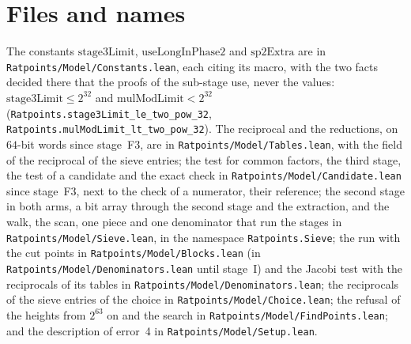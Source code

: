\section{Files and names}\label{sec:stagesFiles}

The constants $\mathrm{stage3Limit}$, $\mathrm{useLongInPhase2}$ and $\mathrm{sp2Extra}$ are in
\verb|Ratpoints/Model/Constants.lean|, each citing its macro, with the two facts decided there that
the proofs of the sub-stage use, never the values: $\mathrm{stage3Limit} \le 2^{32}$ and
$\mathrm{mulModLimit} < 2^{32}$ (\verb|Ratpoints.stage3Limit_le_two_pow_32|,
\verb|Ratpoints.mulModLimit_lt_two_pow_32|). The reciprocal and the reductions, on $64$-bit words
since stage~F3, are in \verb|Ratpoints/Model/Tables.lean|, with the field of the reciprocal of the
sieve entries; the test for common factors, the third stage, the test of a candidate and the exact
check in \verb|Ratpoints/Model/Candidate.lean| since stage~F3, next to the check of a numerator,
their reference; the second stage in both arms, a bit array through the second stage and the
extraction, and the walk, the scan, one piece and one denominator that run the stages in
\verb|Ratpoints/Model/Sieve.lean|, in the namespace \verb|Ratpoints.Sieve|; the run with the cut
points in \verb|Ratpoints/Model/Blocks.lean| (in \verb|Ratpoints/Model/Denominators.lean| until
stage~I) and the Jacobi test with the reciprocals of its tables in
\verb|Ratpoints/Model/Denominators.lean|; the reciprocals of the sieve entries of the choice in
\verb|Ratpoints/Model/Choice.lean|; the refusal of the heights from $2^{63}$ on and the search in
\verb|Ratpoints/Model/FindPoints.lean|; and the description of error~4 in
\verb|Ratpoints/Model/Setup.lean|.

